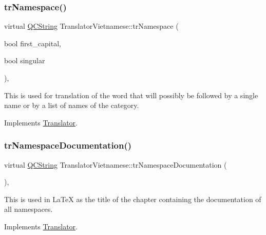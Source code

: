 \subsubsection{\texorpdfstring{trNamespace()}{trNamespace()}}
{\footnotesize\ttfamily virtual \mbox{\hyperlink{class_q_c_string}{Q\+C\+String}} Translator\+Vietnamese\+::tr\+Namespace (\begin{DoxyParamCaption}\item[{bool}]{first\+\_\+capital,  }\item[{bool}]{singular }\end{DoxyParamCaption})\hspace{0.3cm}{\ttfamily [inline]}, {\ttfamily [virtual]}}

This is used for translation of the word that will possibly be followed by a single name or by a list of names of the category. 

Implements \mbox{\hyperlink{class_translator}{Translator}}.

\mbox{\label{class_translator_vietnamese_a5a2c9d549ce8daed5c3cdd0275c2e1fc}} 
\subsubsection{\texorpdfstring{trNamespaceDocumentation()}{trNamespaceDocumentation()}}
{\footnotesize\ttfamily virtual \mbox{\hyperlink{class_q_c_string}{Q\+C\+String}} Translator\+Vietnamese\+::tr\+Namespace\+Documentation (\begin{DoxyParamCaption}{ }\end{DoxyParamCaption})\hspace{0.3cm}{\ttfamily [inline]}, {\ttfamily [virtual]}}

This is used in La\+TeX as the title of the chapter containing the documentation of all namespaces. 

Implements \mbox{\hyperlink{class_translator}{Translator}}.

\mbox{\label{class_translator_vietnamese_a7b759ab94f0ce9635c12e7800866c29c}} 
